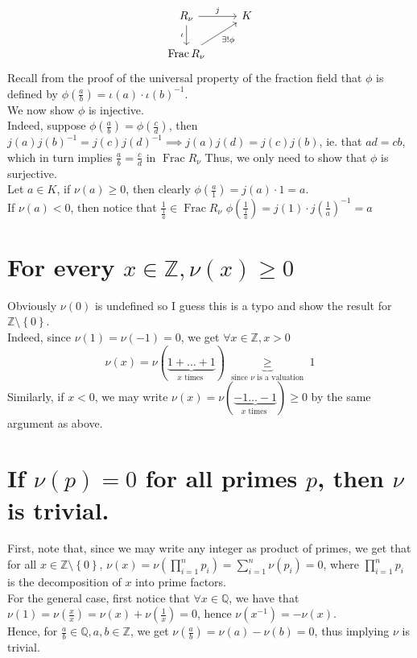 \documentclass[11pt, a4paper]{article}
\DeclareMathOperator{\fr}{Frac}
\begin{document}
\[\begin{tikzcd}
	{R_\nu} & K \\
	{\fr R_\nu}
	\arrow["j", from=1-1, to=1-2]
	\arrow["\iota"', from=1-1, to=2-1]
	\arrow["{\exists ! \phi}"', from=2-1, to=1-2]
\end{tikzcd}\]
Recall from the proof of the universal property of the fraction field that $\phi$ is defined by
$\phi( \frac{a}{b}) = \iota( a) \cdot \iota( b) ^{-1}$.\\
We now show $\phi$ is injective.\\
Indeed, suppose $\phi( \frac{a}{b}) = \phi( \frac{c}{d}) $, then $j ( a) j( b) ^{-1}= j( c) j( d)^{-1}\implies j(a ) j( d) = j( c) j(b) $, ie. that $ad= cb$, which in turn implies $\frac{a}{b}= \frac{c}{d}$ in $ \fr R_\nu$ 
Thus, we only need to show that $\phi$ is surjective.\\
Let $a\in K$, if $\nu( a) \geq 0$, then clearly $ \phi( \frac{a}{1}) = j( a) \cdot 1= a$.\\
If $\nu( a) <0$, then notice that $\frac{1}{\frac{1}{a}}\in \fr R_\nu$  $\phi( \frac{1}{\frac{1}{a}}) = j( 1) \cdot j( \frac{1}{a})^{-1} = a $ 
\section*{ For every $x\in \mathbb{Z}, \nu( x) \geq 0$ }
Obviously $ \nu( 0) $ is undefined so I guess this is a typo and show the result for $ \mathbb{Z}\setminus \left\{ 0 \right\} $.\\

Indeed, since $\nu( 1) =\nu( -1) =0$, we get $\forall x \in \mathbb{Z}, x >0$ 
\[ 
\nu(x) = \nu( \underbrace{1+\ldots + 1}_{ x \text{ times } }) \underbrace{\geq}_{ \text{ since $\nu$ is a valuation } } 1 
\]
Similarly, if $x<0$, we may write $ \nu( x) = \nu( \underbrace{-1\ldots-1}_{x \text{ times } }) \geq 0 $ by the same argument as above.
\section*{ If $\nu( p) =0$ for all primes $p$, then $\nu$ is trivial.}
First, note that, since we may write any integer as product of primes, we get that for all $x\in \mathbb{Z}\setminus \left\{ 0 \right\} $, $\nu( x) = \nu\left( \prod_{i=1}^{n} p_i\right) = \sum_{i=1}^{ n} \nu( p_i) = 0 $, where $\prod_{i=1}^{n}p_i$ is the decomposition of $x$ into prime factors.\\
For the general case, first notice that $\forall x\in \mathbb{Q}$, we have that $\nu( 1) = \nu( \frac{x}{x}) = \nu( x ) +\nu( \frac{1}{x}) =0$, hence $\nu( x^{-1}) = -\nu( x) $.\\
Hence, for $\frac{a}{b}\in \mathbb{Q}, a,b \in \mathbb{Z}$, we get $\nu( \frac{a}{b})= \nu( a ) -\nu( b) =0 $, thus implying $\nu$  is trivial.
\end{document}
